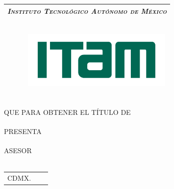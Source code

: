 \thispagestyle{empty}
\begin{titlepage}
	\begin{center}
	\vspace{70pt}
		\begin{tabular}{c}
			\Large \emph{\textsc{
				Instituto Tecnológico Autónomo de México
				}
			}\\
			\hline
		\end{tabular}\\
		\vspace{25pt}
		\includegraphics[width=10cm,height=2.8cm]{Figures/logo-ITAM_new.png}\\
		\vspace{25pt}
		{\huge \thetitle}\\
		\vspace{5pt}
		\vspace{20 pt}
		{\Large \thethesis } \\
		\vspace{5pt}
		QUE PARA OBTENER EL TÍTULO DE \\
		\vspace{5pt}
		{\Large \thedegree} \\
		\vspace{5pt}
		PRESENTA \\
		\vspace{5pt}
		{\Large \theauthor} \\
		\vfill
		ASESOR \\
		{\Large \theadvisor} \\
		\vspace{5pt}
		\begin{tabular}{lcr}
			CDMX. & \hspace{60pt} & \theyear
		\end{tabular}
	\end{center}

\end{titlepage}
